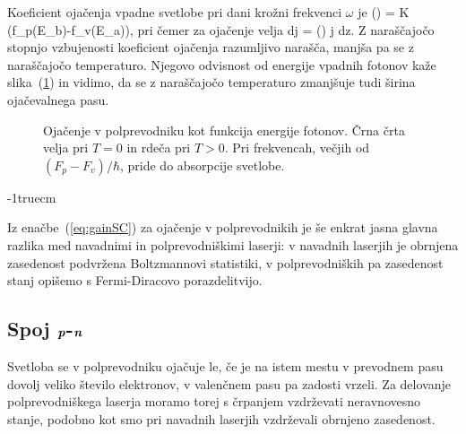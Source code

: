 Koeficient ojačenja vpadne svetlobe pri dani krožni
frekvenci $\omega$ je
\beq
\gamma(\omega) = K \left(f_p(E_b)-f_v(E_a)\right),
\label{eq:gainSC}
\eeq
pri čemer za ojačenje velja
\beq
dj = \gamma(\omega) j dz.
\eeq
Z naraščajočo stopnjo vzbujenosti 
koeficient ojačenja razumljivo narašča, manjša pa se z naraščajočo 
temperaturo. Njegovo odvisnost od energije vpadnih fotonov kaže slika~(\ref{s6.11}) in vidimo,
da se z naraščajočo temperaturo zmanjšuje tudi širina ojačevalnega pasu.
\begin{figure}[h]
\centering
\def\svgwidth{60truemm} 

\caption{Ojačenje v polprevodniku kot funkcija energije fotonov. Črna črta
velja pri $T=0$ in rdeča pri $T>0$. Pri frekvencah, večjih od $(F_p-F_v)/\hbar$,
pride do absorpcije svetlobe. 
}
\label{s6.11}
\end{figure}
\vglue-1truecm
\begin{remark}
Iz enačbe~(\ref{eq:gainSC}) za ojačenje v polprevodnikih je še enkrat jasna glavna 
razlika med navadnimi in polprevodniškimi laserji: v navadnih laserjih je obrnjena
zasedenost podvržena Boltzmannovi statistiki, v polprevodniških pa zasedenost
stanj opišemo s Fermi-Diracovo porazdelitvijo.
\end{remark}

\subsection*{Spoj $\textbf{\textit{p}}$-$\textbf{\textit{n}}$}
Svetloba se v polprevodniku ojačuje le, če je na istem mestu v prevodnem pasu
dovolj veliko število elektronov, v valenčnem pasu pa zadosti vrzeli. Za delovanje
polprevodniškega laserja moramo torej s črpanjem vzdrževati neravnovesno stanje, 
podobno kot smo pri navadnih laserjih vzdrževali obrnjeno zasedenost. 

